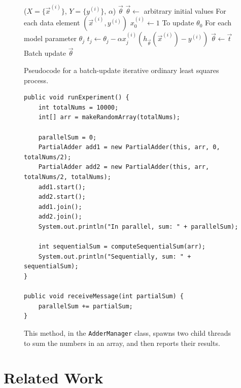\documentclass[twocolumn,letterpaper,10pt]{article}
\begin{document}
\begin{figure}
	\begin{center}
		\begin{algorithmic}
			 ($X = \{\vec{x}^{(i)}\}$, $Y = \{y^{(i)}\}$, $\alpha$)
			\State {}
			 $\vec{\theta}$
			\State $\vec{\theta} \leftarrow$ arbitrary initial values
			\Repeat
			 \Comment For each data element $(\vec{x}^{(i)}, y^{(i)})$
			\State $x_0^{(i)} \leftarrow 1$ \Comment To update $\theta_0$
			 \Comment For each model parameter $\theta_j$
			\State $t_j \leftarrow \theta_j - \alpha x_j^{(i)} (h_{\vec{\theta}}(\vec{x}^{(i)}) - y^{(i)})$
			\EndFor
			\State $\vec{\theta} \leftarrow \vec{t}$ \Comment Batch update
			\EndFor
			 $\vec{\theta}$
		\end{algorithmic}
	\end{center}
	\caption{Pseudocode for a batch-update iterative ordinary least squares process.}
	\label{fig:ols}
\end{figure}

\begin{figure}[t]
	\begin{lstlisting}
public void runExperiment() {
	int totalNums = 10000;
	int[] arr = makeRandomArray(totalNums);
	
	parallelSum = 0;
	PartialAdder add1 = new PartialAdder(this, arr, 0, totalNums/2);
	PartialAdder add2 = new PartialAdder(this, arr, totalNums/2, totalNums);
	add1.start();
	add2.start();
	add1.join();
	add2.join();
	System.out.println("In parallel, sum: " + parallelSum);
	
	int sequentialSum = computeSequentialSum(arr);
	System.out.println("Sequentially, sum: " + sequentialSum);
}
	
public void receiveMessage(int partialSum) {
	parallelSum += partialSum;
}
	\end{lstlisting}
	\caption{This method, in the {\tt AdderManager} class, spawns two child threads to sum the numbers in an array, and then reports their results.} \label{fig:adderManager}
\end{figure}

\section{Related Work}
\end{document}
